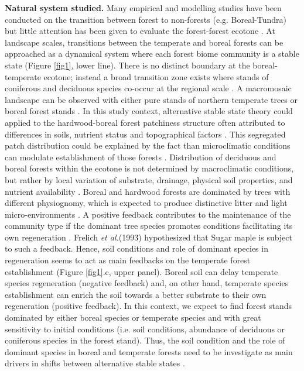 \textbf{Natural system studied.} Many empirical and modelling studies have been
conducted on the transition between forest to non-forests (e.g. Boreal-Tundra) 
\cite{Scheffer2012,Scheffer2001,Hirota2011,Messaoud2007} but little
attention has been given to evaluate the forest-forest ecotone
\cite{Goldblum2010,Graignic2013,Messaoud2007}. At landscape scales, transitions
between  the temperate and boreal forests can be approached as a dynamical
system where each forest biome community is a stable state (Figure \ref{fig1},
lower line). There is no distinct boundary at the boreal-temperate ecotone;
instead a broad transition zone exists where stands of coniferous and
deciduous species co-occur at the regional scale
\cite{Goldblum2010,Fisichelli2013}. A macromosaic landscape can be observed
with either pure stands of northern temperate trees or boreal forest stands
\cite{Goldblum2010,Fisichelli2013}. In this study context, alternative stable
state theory could applied to the hardwood-boreal forest patchiness structure
often attributed to differences in soils, nutrient status and topographical
factors \cite{Society2014}. This segregated patch distribution could be
explained by the fact than microclimatic conditions can modulate establishment
of those forests \cite{DeFrenne2013}. Distribution of deciduous and boreal
forests within the ecotone is not determined by macroclimatic conditions, but
rather by local variation of substrate, drainage, physical soil properties,
and nutrient availability \cite{Goldblum2010,Society2014}. Boreal and hardwood
forests are dominated by trees with different physiognomy, which is expected
to produce distinctive litter and light micro-environments \cite{Barras1998}.
A positive feedback contributes to the maintenance of the community type if the
dominant tree species promotes conditions facilitating its own regeneration
\cite{Barras1998}. Frelich \textit{et al.}(1993) \cite{Society2014}
hypothesized that Sugar maple is subject to such a feedback. Hence, soil
conditions and role of dominant species in regeneration seems to act as main
feedbacks on the temperate forest establishment (Figure \ref{fig1}.c, upper
panel). Boreal soil can delay temperate species regeneration (negative
feedback) and, on other hand, temperate species establishment can enrich the
soil towards a better substrate to their own regeneration (positive feedback).
In this context, we expect to find forest stands dominated by either boreal
species or temperate species and with great sensitivity to initial conditions
(i.e. soil conditions, abundance of deciduous or coniferous
species in the forest stand). Thus, the soil condition and the role of
dominant species in boreal and temperate forests need to be investigate as main
drivers in shifts between alternative stable states
\cite{Kellman2004,Moore2008,DeFrenne2013,Barras1998}.

